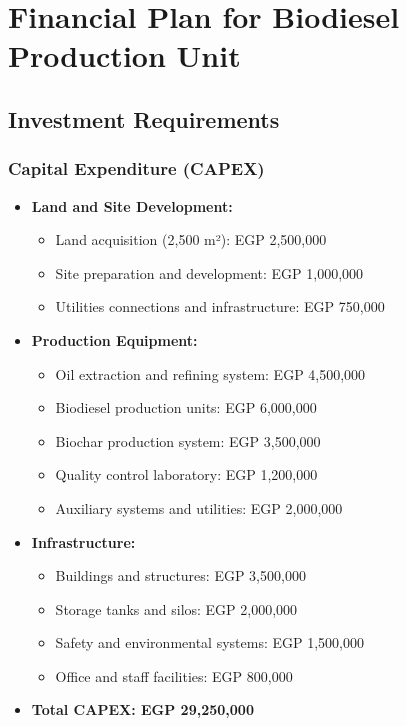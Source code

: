 \section{Financial Plan for Biodiesel Production Unit}

\subsection{Investment Requirements}

\subsubsection{Capital Expenditure (CAPEX)}
\begin{itemize}
    \item \textbf{Land and Site Development:}
    \begin{itemize}
        \item Land acquisition (2,500 m²): EGP 2,500,000
        \item Site preparation and development: EGP 1,000,000
        \item Utilities connections and infrastructure: EGP 750,000
    \end{itemize}
    
    \item \textbf{Production Equipment:}
    \begin{itemize}
        \item Oil extraction and refining system: EGP 4,500,000
        \item Biodiesel production units: EGP 6,000,000
        \item Biochar production system: EGP 3,500,000
        \item Quality control laboratory: EGP 1,200,000
        \item Auxiliary systems and utilities: EGP 2,000,000
    \end{itemize}
    
    \item \textbf{Infrastructure:}
    \begin{itemize}
        \item Buildings and structures: EGP 3,500,000
        \item Storage tanks and silos: EGP 2,000,000
        \item Safety and environmental systems: EGP 1,500,000
        \item Office and staff facilities: EGP 800,000
    \end{itemize}
    
    \item \textbf{Total CAPEX: EGP 29,250,000}
\end{itemize}

